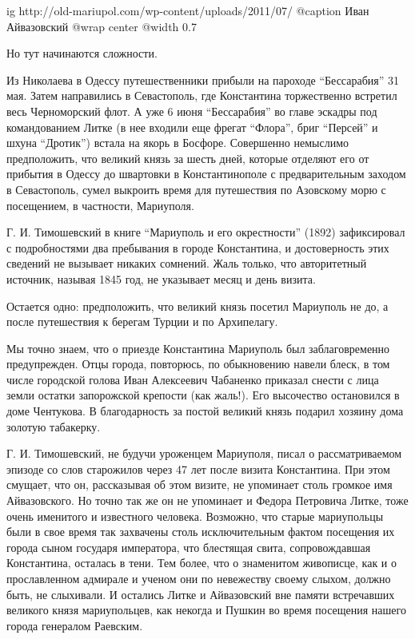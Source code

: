\ifcmt
  ig http://old-mariupol.com/wp-content/uploads/2011/07/%
	@caption Иван Айвазовский
  @wrap center
  @width 0.7
\fi

Но тут начинаются сложности.

Из Николаева в Одессу путешественники прибыли на пароходе \enquote{Бессарабия} 31 мая.
Затем направились в Севастополь, где Константина торжественно встретил весь
Черноморский флот. А уже 6 июня \enquote{Бессарабия} во главе эскадры под
командованием Литке (в нее входили еще фрегат \enquote{Флора}, бриг \enquote{Персей} и шхуна
\enquote{Дротик}) встала на якорь в Босфоре. Совершенно немыслимо предположить, что
великий князь за шесть дней, которые отделяют его от прибытия в Одессу до
швартовки в Константинополе с предварительным заходом в Севастополь, сумел
выкроить время для путешествия по Азовскому морю с посещением, в частности,
Мариуполя.

Г. И. Тимошевский в книге \enquote{Мариуполь и его окрестности} (1892) зафиксировал с
подробностями два пребывания в городе Константина, и достоверность этих
сведений не вызывает никаких сомнений. Жаль только, что авторитетный источник,
называя 1845 год, не указывает месяц и день визита.

Остается одно: предположить, что великий князь посетил Мариуполь не до, а после
путешествия к берегам Турции и по Архипелагу.

Мы точно знаем, что о приезде Константина Мариуполь был заблаговременно
предупрежден. Отцы города, повторюсь, по обыкновению навели блеск, в том числе
городской голова Иван Алексеевич Чабаненко приказал снести с лица земли остатки
запорожской крепости (как жаль!). Его высочество остановился в доме Чентукова.
В благодарность за постой великий князь подарил хозяину дома золотую табакерку.

Г. И. Тимошевский, не будучи уроженцем Мариуполя, писал о рассматриваемом
эпизоде со слов старожилов через 47 лет после визита Константина. При этом
смущает, что он, рассказывая об этом визите, не упоминает столь громкое имя
Айвазовского. Но точно так же он не упоминает и Федора Петровича Литке, тоже
очень именитого и известного человека. Возможно, что старые мариупольцы были в
свое время так захвачены столь исключительным фактом посещения их города сыном
государя императора, что блестящая свита, сопровождавшая Константина, осталась
в тени. Тем более, что о знаменитом живописце, как и о прославленном адмирале
и ученом они по невежеству своему слыхом, должно быть, не слыхивали. И
остались Литке и Айвазовский вне памяти встречавших великого князя
мариупольцев, как некогда и Пушкин во время посещения нашего города генералом
Раевским.

